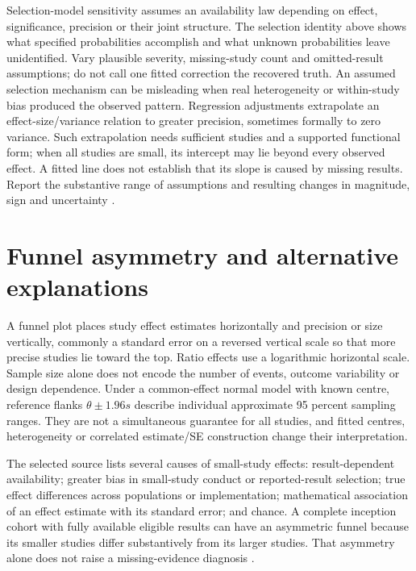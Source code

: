 Selection-model sensitivity assumes an availability law depending on
effect, significance, precision or their joint structure. The selection
identity above shows what specified probabilities accomplish and what
unknown probabilities leave unidentified. Vary plausible severity,
missing-study count and omitted-result assumptions; do not call one
fitted correction the recovered truth. An assumed selection mechanism
can be misleading when real heterogeneity or within-study bias produced
the observed pattern.
Regression adjustments extrapolate an effect-size/variance relation
to greater precision, sometimes formally to zero variance. Such
extrapolation needs sufficient studies and a supported functional
form; when all studies are small, its intercept may lie beyond every
observed effect. A fitted line does not establish that its slope is
caused by missing results. Report the substantive range of assumptions
and resulting changes in magnitude, sign and uncertainty
\cite[sec.~13.3.4.6]{PageHigginsSterne2024Cochrane13}.

\section{Funnel asymmetry and alternative explanations}
\label{sec:p15-missing-funnel}

A funnel plot places study effect estimates horizontally and precision
or size vertically, commonly a standard error on a reversed vertical
scale so that more precise studies lie toward the top. Ratio effects
use a logarithmic horizontal scale. Sample size alone does not encode
the number of events, outcome variability or design dependence.
Under a common-effect normal model with known centre, reference flanks
\(\theta\pm1.96s\) describe individual approximate 95 percent
sampling ranges. They are not a simultaneous guarantee for all studies,
and fitted centres, heterogeneity or correlated estimate/SE construction
change their interpretation.

The selected source lists several causes of small-study effects:
result-dependent availability; greater bias in small-study conduct or
reported-result selection; true effect differences across populations
or implementation; mathematical association of an effect estimate with
its standard error; and chance. A complete inception cohort with fully
available eligible results can have an asymmetric funnel because
its smaller studies differ substantively from its larger studies.
That asymmetry alone does not raise a missing-evidence diagnosis
\cite[secs.~13.3.4.2--13.3.4.5, 13.3.5]{PageHigginsSterne2024Cochrane13}.

